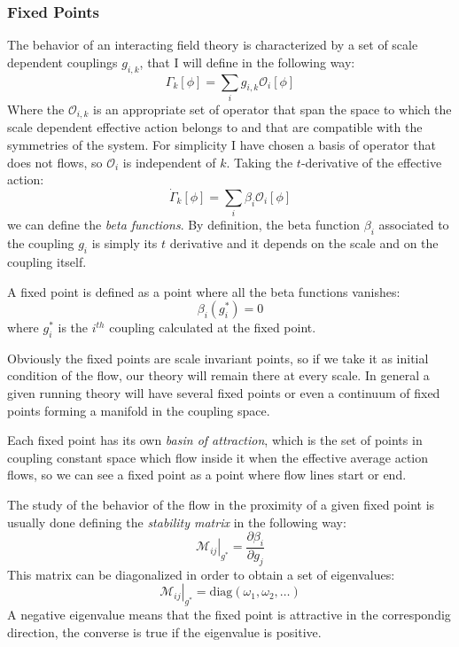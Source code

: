 \subsubsection{Fixed Points}
The behavior of an interacting field theory is characterized by a set of scale dependent couplings $g_{i,k}$, that I will define in the following way:
$$ \Gamma_k\left[\phi\right]=\sum_i g_{i,k}\mathcal{O}_{i}\left[\phi\right]$$
Where the $\mathcal{O}_{i,k}$ is an appropriate set of operator that span the space to which the scale dependent effective action belongs to 
and that are compatible with the symmetries of the system. For simplicity I have chosen a basis of operator that does not flows, 
so $\mathcal{O}_i$ is independent of $k$.
Taking the $t$-derivative of the effective action:
$$ \dot{\Gamma}_k\left[\phi\right]=\sum_i \beta_i \mathcal{O}_i\left[\phi\right]$$
we can define the \emph{beta functions}. By definition, the beta function $\beta_i$ associated to the coupling $g_i$ is simply its 
$t$ derivative and it depends on the scale and on the coupling itself.

A fixed point is defined as a point where all the beta functions vanishes:
\begin{equation}
 \beta_i (g_i^*) = 0
\end{equation}
where $g_i^*$ is the $i^{th}$ coupling calculated at the fixed point.

Obviously the fixed points are scale invariant points, 
so if we take it as initial condition of the flow, our theory will remain there at every scale. 
In general a given running theory will have several fixed points or even a continuum of fixed points forming a manifold 
in the coupling space.

Each fixed point has its own \emph{basin of attraction}, which is the set of points in coupling constant space which flow inside  
 it when the effective average action flows, so we can see a fixed point as a point where flow lines start or end.

 The study of the behavior of the flow in the proximity of a given fixed point is usually done defining the \emph{stability matrix} in the following way:
\begin{equation}
\left.\mathcal{M}_{ij} \right|_{g^*}=\frac{\partial {\beta}_i}{\partial {g}_j} 
\end{equation}
This matrix can be diagonalized in order to obtain a set of eigenvalues:
\begin{equation}
 \left.\mathcal{M}_{ij}\right|_{{g}^*}=\text{diag}\left(\omega_1,\omega_2,\dots\right)
\end{equation}
A negative eigenvalue means that the fixed point is attractive in the correspondig direction, the converse is true if the eigenvalue is positive.

